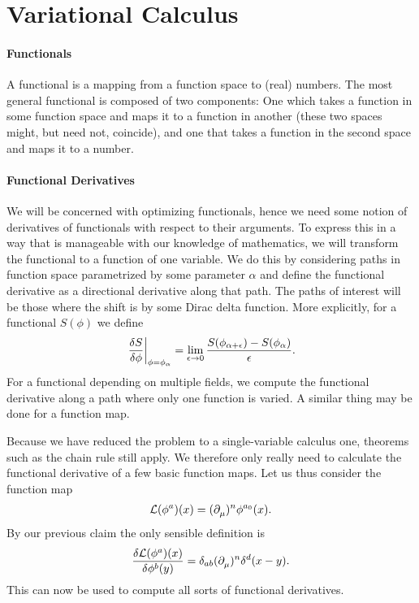 \section{Variational Calculus}

\paragraph{Functionals}
A functional is a mapping from a function space to (real) numbers. The most general functional is composed of two components: One which takes a function in some function space and maps it to a function in another (these two spaces might, but need not, coincide), and one that takes a function in the second space and maps it to a number.

\paragraph{Functional Derivatives}
We will be concerned with optimizing functionals, hence we need some notion of derivatives of functionals with respect to their arguments. To express this in a way that is manageable with our knowledge of mathematics, we will transform the functional to a function of one variable. We do this by considering paths in function space parametrized by some parameter $\alpha$ and define the functional derivative as a directional derivative along that path. The paths of interest will be those where the shift is by some Dirac delta function. More explicitly, for a functional $S(\phi)$ we define
\begin{align*}
	\eval{\fdv{S}{\phi}}_{\phi = \phi_{\alpha}} = \lim\limits_{\epsilon\to 0}\frac{S(\phi_{\alpha + \epsilon}) - S(\phi_{\alpha})}{\epsilon}.
\end{align*}
For a functional depending on multiple fields, we compute the functional derivative along a path where only one function is varied. A similar thing may be done for a function map.

Because we have reduced the problem to a single-variable calculus one, theorems such as the chain rule still apply. We therefore only really need to calculate the functional derivative of a few basic function maps. Let us thus consider the function map
\begin{align*}
	\mathcal{L}(\phi^{a})(x) = (\partial^{}_{\mu})^{n}\phi^{a_{0}}(x).
\end{align*}
By our previous claim the only sensible definition is
\begin{align*}
	\fdv{\lag(\phi^{a})(x)}{\phi^{b}(y)} = \delta_{ab}(\del{}{\mu})^{n}\delta^{d}(x - y).
\end{align*}
This can now be used to compute all sorts of functional derivatives.


